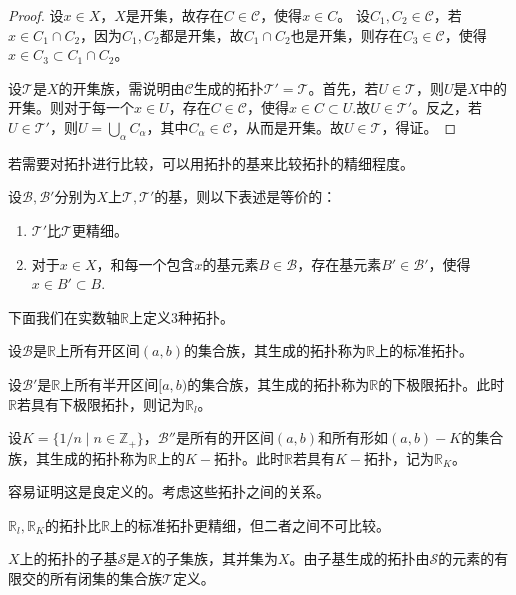 \documentclass{article}
\newcommand{\cT}{\mathcal{T}}
\newcommand{\RR}{\mathbb{R}}
\newcommand{\ZZ}{\mathbb{Z}}
\begin{document}
\begin{proof}
    设\(x\in X\)，\(X\)是开集，故存在\(C\in \mathcal{C}\)，使得\(x\in C\)。
    设\(C_1,C_2\in \mathcal{C}\)，若\(x\in C_1\cap C_2\)，因为\(C_1,C_2\)都是开集，故\(C_1\cap C_2\)也是开集，则存在\(C_3\in\mathcal{C}\)，使得\(x\in C_3\subset C_1\cap C_2\)。
    
    设\(\cT\)是\(X\)的开集族，需说明由\(\mathcal{C}\)生成的拓扑\(\cT'=\cT\)。首先，若\(U\in \cT\)，则\(U\)是\(X\)中的开集。则对于每一个\(x\in U\)，存在\(C\in \mathcal{C}\)，使得\(x\in C\subset U\).故\(U \in \cT'\)。反之，若\(U\in \cT'\)，则\(U=\bigcup_\alpha C_\alpha\)，其中\(C_\alpha\in \mathcal{C}\)，从而是开集。故\(U\in \cT\)，得证。
\end{proof}

若需要对拓扑进行比较，可以用拓扑的基来比较拓扑的精细程度。

\begin{lemma}
    设\(\mathcal{B},\mathcal{B}'\)分别为\(X\)上\(\cT,\cT'\)的基，则以下表述是等价的：\begin{enumerate}
        \item \(\cT'\)比\(\cT\)更精细。
        \item 对于\(x\in X\)，和每一个包含\(x\)的基元素\(B\in \mathcal{B}\)，存在基元素\(B'\in \mathcal{B}'\)，使得\(x\in B'\subset B\).
    \end{enumerate}
\end{lemma}

下面我们在实数轴\(\RR\)上定义\(3\)种拓扑。

\begin{definition}
    设\(\mathcal{B}\)是\(\RR\)上所有开区间\((a,b)\)的集合族，其生成的拓扑称为\(\RR\)上的标准拓扑。
    
    设\(\mathcal{B}'\)是\(\RR\)上所有半开区间\([a,b)\)的集合族，其生成的拓扑称为\(\RR\)的下极限拓扑。此时\(\RR\)若具有下极限拓扑，则记为\(\RR_l\)。

    设\(K=\{1/n\mid n\in \ZZ_+\}\)，\(\mathcal{B}''\)是所有的开区间\((a,b)\)和所有形如\((a,b)-K\)的集合族，其生成的拓扑称为\(\RR\)上的\(K-\)拓扑。此时\(\RR\)若具有\(K-\)拓扑，记为\(\RR_K\)。
\end{definition}

容易证明这是良定义的。考虑这些拓扑之间的关系。
\begin{lemma}
    \(\RR_l,\RR_K\)的拓扑比\(\RR\)上的标准拓扑更精细，但二者之间不可比较。
\end{lemma}

\begin{definition}
    \(X\)上的拓扑的子基\(\mathcal{S}\)是\(X\)的子集族，其并集为\(X\)。由子基生成的拓扑由\(\mathcal{S}\)的元素的有限交的所有闭集的集合族\(\cT\)定义。
\end{definition}
\end{document}
